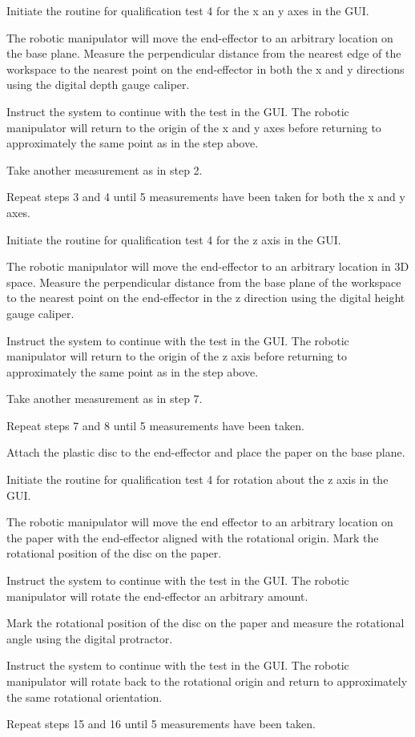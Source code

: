 \begin{compactenum}
	\item Initiate the routine for qualification test 4 for the x an y axes in the GUI.
	\item The robotic manipulator will move the end-effector to an arbitrary location on the base plane. Measure the perpendicular distance from the nearest edge of the workspace to the nearest point on the end-effector in both the x and y directions using the digital depth gauge caliper.
	\item Instruct the system to continue with the test in the GUI. The robotic manipulator will return to the origin of the x and y axes before returning to approximately the same point as in the step above.
	\item Take another measurement as in step 2.
	\item Repeat steps 3 and 4 until 5 measurements have been taken for both the x and y axes.
	\item Initiate the routine for qualification test 4 for the z axis in the GUI.
	\item The robotic manipulator will move the end-effector to an arbitrary location in 3D space. Measure the perpendicular distance from the base plane of the workspace to the nearest point on the end-effector in the z direction using the digital height gauge caliper.
	\item Instruct the system to continue with the test in the GUI. The robotic manipulator will return to the origin of the z axis before returning to approximately the same point as in the step above.
	\item Take another measurement as in step 7.
	\item Repeat steps 7 and 8 until 5 measurements have been taken.
	\item Attach the plastic disc to the end-effector and place the paper on the base plane.
	\item Initiate the routine for qualification test 4 for rotation about the z axis in the GUI.
	\item The robotic manipulator will move the end effector to an arbitrary location on the paper with the end-effector aligned with the rotational origin. Mark the rotational position of the disc on the paper.
	\item Instruct the system to continue with the test in the GUI. The robotic manipulator will rotate the end-effector an arbitrary amount.
	\item Mark the rotational position of the disc on the paper and measure the rotational angle using the digital protractor.
	\item Instruct the system to continue with the test in the GUI. The robotic manipulator will rotate back to the rotational origin and return to approximately the same rotational orientation.
	\item Repeat steps 15 and 16 until 5 measurements have been taken.
\end{compactenum}

